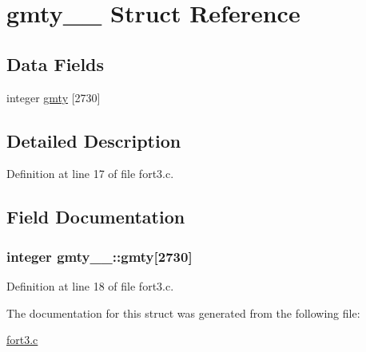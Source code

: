 \hypertarget{structgmty__1__}{}\section{gmty\+\_\+\_\+ Struct Reference}
\label{structgmty__1__}
\subsection*{Data Fields}
\begin{DoxyCompactItemize}
\item 
integer \hyperlink{structgmty__1___a570361c8c6313651a56de344303cdaea}{gmty} \mbox{[}2730\mbox{]}
\end{DoxyCompactItemize}


\subsection{Detailed Description}


Definition at line 17 of file fort3.\+c.



\subsection{Field Documentation}
\subsubsection[{\texorpdfstring{gmty}{gmty}}]{\setlength{\rightskip}{0pt plus 5cm}integer gmty\+\_\+\_\+\+::gmty\mbox{[}2730\mbox{]}}\hypertarget{structgmty__1___a570361c8c6313651a56de344303cdaea}{}\label{structgmty__1___a570361c8c6313651a56de344303cdaea}


Definition at line 18 of file fort3.\+c.



The documentation for this struct was generated from the following file\+:\begin{DoxyCompactItemize}
\item 
\hyperlink{fort3_8c}{fort3.\+c}\end{DoxyCompactItemize}
